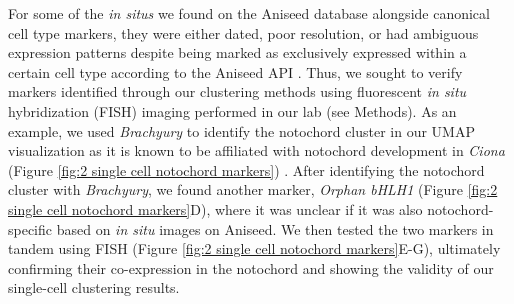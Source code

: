For some of the \textit{in situs} we found on the Aniseed database alongside canonical cell type markers, they were either dated, poor resolution, or had ambiguous expression patterns despite being marked as exclusively expressed within a certain cell type according to the Aniseed API \cite{dardaillon2020}. Thus, we sought to verify markers identified through our clustering methods using fluorescent \textit{in situ} hybridization (FISH) imaging performed in our lab (see Methods). As an example, we used \textit{Brachyury} to identify the notochord cluster in our UMAP visualization as it is known to be affiliated with notochord development in \textit{Ciona} (Figure \ref{fig:2 single cell notochord markers}) \cite{chesley1935,wilkinson1990,yasuo1993,reeves2021,casey1998,conlon2001,barnett1998,corbo1997,chiba2009,jose-edwards2015a,lolas2014,katikala2013,schulte-merker1995,muller1997,matsumoto2007a,passamaneck2009a}. After identifying the notochord cluster with \textit{Brachyury}, we found another marker, \textit{Orphan bHLH1} (Figure \ref{fig:2 single cell notochord markers}D), where it was unclear if it was also notochord-specific based on \textit{in situ} images on Aniseed. We then tested the two markers in tandem using FISH (Figure \ref{fig:2 single cell notochord markers}E-G), ultimately confirming their co-expression in the notochord and showing the validity of our single-cell clustering results. 

